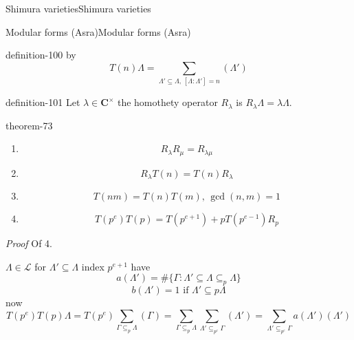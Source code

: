 \documentclass[10pt,]{book}
\makeatletter
\renewcommand*{\proofname}{Proof}
\renewenvironment{proof}[1][\proofname]{\par
  \pushQED{\qed}%
  \normalfont \topsep6\p@\@plus6\p@\relax
  \trivlist
  \item\relax
    {\itshape
    #1\@addpunct{.}}\hspace\labelsep\ignorespaces
}{%
  \popQED\endtrivlist\@endpefalse
}
\numberwithin{equation}{section}
\newcommand{\CC}{\mathbf{C}}
\makeatother
\begin{document}
\begin{chapterptx}{Shimura varieties}{}{Shimura varieties}{}{}
\begin{sectionptx}{Modular forms (Asra)}{}{Modular forms (Asra)}{}{}
\begin{definition}{}{definition-100}
by%
\begin{equation*}
T(n) \Lambda = \sum_{\Lambda' \subseteq \Lambda,\,[\Lambda : \Lambda'] = n} (\Lambda')
\end{equation*}
%
\end{definition}
\begin{definition}{}{definition-101}%
\hypertarget{p-1073}{}%
Let \(\lambda \in \CC^\times\) the homothety operator \(R_\lambda\) is \(R_\lambda \Lambda = \lambda\Lambda\).%
\end{definition}
\begin{theorem}{}{}{theorem-73}%
\hypertarget{p-1074}{}%
\leavevmode%
\begin{enumerate}
\item\hypertarget{li-266}{}%
\begin{equation*}
R_\lambda R_\mu = R_{\lambda\mu}
\end{equation*}
%
\item\hypertarget{li-267}{}%
\begin{equation*}
R_\lambda T(n) = T(n) R_{\lambda}
\end{equation*}
%
\item\hypertarget{li-268}{}%
\begin{equation*}
T(nm) = T(n) T(m),\,\gcd(n,m) =1
\end{equation*}
%
\item\hypertarget{li-269}{}%
\begin{equation*}
T(p^e)T(p) = T(p^{e+1 }) + p T(p^{e-1}) R_p
\end{equation*}
%
\end{enumerate}
%
\end{theorem}
\begin{proof}\hypertarget{proof-110}{}
\hypertarget{p-1075}{}%
Of 4.%
\par
\hypertarget{p-1076}{}%
\(\Lambda \in \mathcal L\) for \(\Lambda' \subseteq \Lambda \) index \(p^{e+1}\) have%
\begin{equation*}
a(\Lambda')  = \# \{ \Gamma : \Lambda'  \subseteq \Lambda \subseteq_p \Lambda \}
\end{equation*}
%
\begin{equation*}
b(\Lambda')  = 1 \text{ if } \Lambda' \subseteq p\Lambda
\end{equation*}
now%
\begin{equation*}
T(p^e)T(p) \Lambda = T(p^e) \sum_{\Gamma \subseteq_p \Lambda } (\Gamma) = \sum_{\Gamma \subseteq_p \Lambda } \sum_{\Lambda' \subseteq_{p^e} \Gamma} (\Lambda') =\sum_{\Lambda' \subseteq_{p^e} \Gamma}  a(\Lambda') (\Lambda')

\end{equation*}
\end{proof}
\end{sectionptx}
\end{chapterptx}
\end{document}
